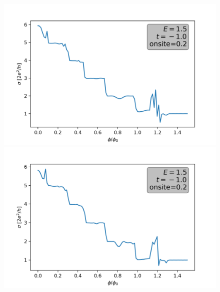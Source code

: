 \documentclass[12pt]{article}
\numberwithin{equation}{section}
\begin{document}
\newpage
\begin{figure}
  \centering
  \begin{minipage}{0.49\textwidth}
    \centering
    \includegraphics[width=1.0\textwidth]{./media/qpc_L10_W5_VS0_2_cond_phi_e1_5.png} %
  \end{minipage}\hfill
  \begin{minipage}{0.49\textwidth}
      \centering
      \includegraphics[width=1.0\textwidth]{./media/qpc_L15_W5_VS0_2_cond_phi_e1_5.png} %
  \end{minipage}
\end{figure}

\newpage
\end{document}
